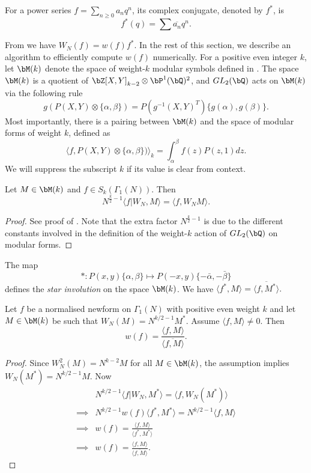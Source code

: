 \documentclass [11pt, proquest] {uwthesis}[2015/03/03]
\begin{document}
For a power series  $f = \sum_{n \geq 0} a_nq^n$, its complex conjugate, denoted by $f^*$, is $$f^*(q) = \sum \overline{a_n}q^n.$$ 

From \cite{atkin1978twists} we have $W_N(f) = w(f) f^*$. In the rest of this section, we describe an algorithm to efficiently compute $w(f)$ numerically.  For a positive even integer $k$, let $\bM(k)$ denote the space of weight-$k$ modular symbols defined in \cite{stein2007modular}. The space $\bM(k)$ is a quotient of $\bZ[X,Y]_{k-2} \otimes \bP^1(\bQ)^2$, and $GL_2(\bQ)$ acts on $\bM(k)$ via the following rule
\[
	g (P(X,Y) \otimes \{\alpha, \beta\}) = P( g^{-1}(X,Y)^T) \{g(\alpha), g(\beta)\}.
\]
Most importantly, there is a pairing between $\bM(k)$ and the space of modular forms of weight $k$, defined as
\[
		\langle f, P(X,Y) \otimes \{\alpha, \beta\}) \rangle_k = \int_{\alpha}^{\beta} f(z) P(z,1) dz.
\]
We will suppress the subscript $k$ if its value is clear from context.


\begin{Lemma}
Let $M \in \bM(k)$ and $f \in S_k(\Gamma_1(N))$. Then 
\[
	N^{\frac{k}{2}-1} \langle f|W_N, M \rangle = \langle f, W_N M \rangle.
\]
\end{Lemma}

\begin{proof}
See proof of  \cite[Proposition 8.17]{stein2007modular}. Note that the extra factor $N^{\frac{k}{2}-1}$ is due to the different constants involved in the definition of the weight-$k$ action of $GL_2(\bQ)$ on modular forms. 
\end{proof}

The map  
\[
	*: P(x,y)\{\alpha, \beta\} \mapsto P(-x,y) \{-\bar{\alpha}, -\bar{\beta}\} 
\]
defines the {\it star involution} on the space $\bM(k)$. We have $\langle f^*, M \rangle = \overline{\langle f, M^*\rangle}.$


\begin{Lemma}
Let $f$ be a normalised newform on $\Gamma_1(N)$ with positive even weight $k$ and let $M \in \bM(k)$ be such that $W_N(M) = N^{k/2 -1} M^*$. Assume $\langle f, M \rangle \neq 0$.  Then 
\[
	w(f) = \frac{\langle f,M \rangle }{\overline{\langle f,M \rangle}}.
\]
\end{Lemma} 

\begin{proof}
Since $W_N^2(M) = N^{k-2}M$ for all $M \in \bM(k)$, the assumption implies $W_N(M^*) = N^{k/2 -1} M$. 
Now 
\begin{align*}
& N^{k/2-1} \langle f|W_N, M^* \rangle  = \langle f,W_N(M^*) \rangle \\
\implies & N^{k/2-1} w(f) \langle   f^*,M^* \rangle = N^{k/2-1} \langle f, M \rangle \\
\implies & w(f) = \frac{\langle f, M \rangle}{\langle f^*,M^* \rangle} \\ 
\implies &	w(f) = \frac{\langle f, M \rangle}{\overline{\langle f, M \rangle}}.
\end{align*}
\end{proof}
\end{document}
